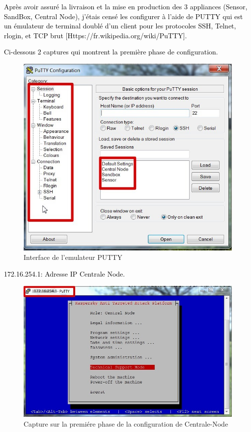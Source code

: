 \documentclass[a4paper,12pt]{report}
\begin{document}
\textcolor{black}{Après avoir assuré la livraison et la mise en production des 3 appliances (Sensor, SandBox, Central Node), j’étais censé les configurer à l’aide de PUTTY qui est un émulateur de terminal doublé d'un client pour les protocoles SSH, Telnet, rlogin, et TCP brut [Https://fr.wikipedia.org/wiki/PuTTY].}

\textcolor{black}{Ci-dessous 2 captures qui montrent la première phase de configuration.}

\begin{figure}[H]
	\begin{center}
		\includegraphics[width=0.8\linewidth]{Projet_KATA/iPutty}
\end{center}
	\caption{Interface de l'emulateur PUTTY}
	\label{fig:7}	
\end{figure}
\textcolor{black}{172.16.254.1: Adresse IP Centrale Node.}
\begin{figure}[H]
	\begin{center}
		\includegraphics[width=0.8\linewidth]{Projet_KATA/Putty}
\end{center}
	\caption{Capture sur la premiére phase de la configuration de Centrale-Node}
	\label{fig:8}	
\end{figure}		 
		 
\end{document}
